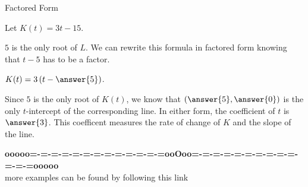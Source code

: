 \documentclass{ximera}
\begin{document}
\begin{example}  Factored Form



Let $K(t) = 3t - 15$.


$5$ is the only root of $L$.  We can rewrite this formula in factored form knowing that $t-5$ has to be a factor.


$K(t) = 3 \left(t - \answer{5} \right)$.



Since $5$ is the only root of $K(t)$, we know that $\left(\answer{5}, \answer{0}\right)$ is the only $t$-intercept of the corresponding line.  In either form, the coefficient of $t$ is $\answer{3}$.  This coefficent measures the rate of change of $K$ and the slope of the line.

\end{example}




















\begin{center}
\textbf{\textcolor{green!50!black}{ooooo=-=-=-=-=-=-=-=-=-=-=-=-=ooOoo=-=-=-=-=-=-=-=-=-=-=-=-=ooooo}} \\

more examples can be found by following this link\\ 

\end{center}
\end{document}

